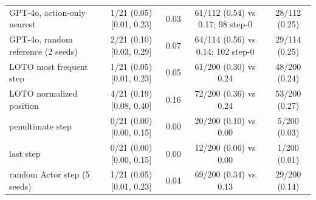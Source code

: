 \begin{table}[!t]
\begin{tabular}{lcccc}
GPT-4o, action-only nearest & 1/21 (0.05) [0.01, 0.23] & 0.03 & 61/112 (0.54) vs 0.17; 98 step-0 & 28/112 (0.25) \\
GPT-4o, random reference (2 seeds) & 2/21 (0.10) [0.03, 0.29] & 0.07 & 64/114 (0.56) vs 0.14; 102 step-0 & 29/114 (0.25) \\
LOTO most frequent step & 1/21 (0.05) [0.01, 0.23] & 0.05 & 61/200 (0.30) vs 0.24 & 48/200 (0.24) \\
LOTO normalized position & 4/21 (0.19) [0.08, 0.40] & 0.16 & 72/200 (0.36) vs 0.24 & 53/200 (0.27) \\
penultimate step & 0/21 (0.00) [0.00, 0.15] & 0.00 & 20/200 (0.10) vs 0.00 & 5/200 (0.03) \\
last step & 0/21 (0.00) [0.00, 0.15] & 0.00 & 12/200 (0.06) vs 0.00 & 1/200 (0.01) \\
random Actor step (5 seeds) & 1/21 (0.05) [0.01, 0.23] & 0.04 & 69/200 (0.34) vs 0.13 & 29/200 (0.14) \\
\bottomrule
\end{tabular}
\end{table}
